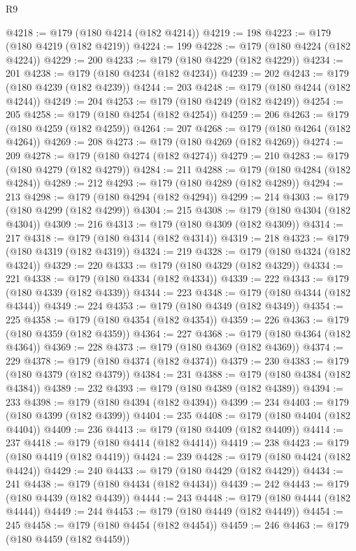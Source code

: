 \begin{lexlean}{R9}
\begin{coremodule}
{{{{{{{{{{{{{{{{{{{{{{{{{{{{{{{{{{{{{{{{{{{{{{{{{{{{{{{{{{{{{{{{{{{{{{{{{{{{{{{{{{{{@4218 := @179 (@180 @4214 (@182 @4214))
@4219 := 198
@4223 := @179 (@180 @4219 (@182 @4219))
@4224 := 199
@4228 := @179 (@180 @4224 (@182 @4224))
@4229 := 200
@4233 := @179 (@180 @4229 (@182 @4229))
@4234 := 201
@4238 := @179 (@180 @4234 (@182 @4234))
@4239 := 202
@4243 := @179 (@180 @4239 (@182 @4239))
@4244 := 203
@4248 := @179 (@180 @4244 (@182 @4244))
@4249 := 204
@4253 := @179 (@180 @4249 (@182 @4249))
@4254 := 205
@4258 := @179 (@180 @4254 (@182 @4254))
@4259 := 206
@4263 := @179 (@180 @4259 (@182 @4259))
@4264 := 207
@4268 := @179 (@180 @4264 (@182 @4264))
@4269 := 208
@4273 := @179 (@180 @4269 (@182 @4269))
@4274 := 209
@4278 := @179 (@180 @4274 (@182 @4274))
@4279 := 210
@4283 := @179 (@180 @4279 (@182 @4279))
@4284 := 211
@4288 := @179 (@180 @4284 (@182 @4284))
@4289 := 212
@4293 := @179 (@180 @4289 (@182 @4289))
@4294 := 213
@4298 := @179 (@180 @4294 (@182 @4294))
@4299 := 214
@4303 := @179 (@180 @4299 (@182 @4299))
@4304 := 215
@4308 := @179 (@180 @4304 (@182 @4304))
@4309 := 216
@4313 := @179 (@180 @4309 (@182 @4309))
@4314 := 217
@4318 := @179 (@180 @4314 (@182 @4314))
@4319 := 218
@4323 := @179 (@180 @4319 (@182 @4319))
@4324 := 219
@4328 := @179 (@180 @4324 (@182 @4324))
@4329 := 220
@4333 := @179 (@180 @4329 (@182 @4329))
@4334 := 221
@4338 := @179 (@180 @4334 (@182 @4334))
@4339 := 222
@4343 := @179 (@180 @4339 (@182 @4339))
@4344 := 223
@4348 := @179 (@180 @4344 (@182 @4344))
@4349 := 224
@4353 := @179 (@180 @4349 (@182 @4349))
@4354 := 225
@4358 := @179 (@180 @4354 (@182 @4354))
@4359 := 226
@4363 := @179 (@180 @4359 (@182 @4359))
@4364 := 227
@4368 := @179 (@180 @4364 (@182 @4364))
@4369 := 228
@4373 := @179 (@180 @4369 (@182 @4369))
@4374 := 229
@4378 := @179 (@180 @4374 (@182 @4374))
@4379 := 230
@4383 := @179 (@180 @4379 (@182 @4379))
@4384 := 231
@4388 := @179 (@180 @4384 (@182 @4384))
@4389 := 232
@4393 := @179 (@180 @4389 (@182 @4389))
@4394 := 233
@4398 := @179 (@180 @4394 (@182 @4394))
@4399 := 234
@4403 := @179 (@180 @4399 (@182 @4399))
@4404 := 235
@4408 := @179 (@180 @4404 (@182 @4404))
@4409 := 236
@4413 := @179 (@180 @4409 (@182 @4409))
@4414 := 237
@4418 := @179 (@180 @4414 (@182 @4414))
@4419 := 238
@4423 := @179 (@180 @4419 (@182 @4419))
@4424 := 239
@4428 := @179 (@180 @4424 (@182 @4424))
@4429 := 240
@4433 := @179 (@180 @4429 (@182 @4429))
@4434 := 241
@4438 := @179 (@180 @4434 (@182 @4434))
@4439 := 242
@4443 := @179 (@180 @4439 (@182 @4439))
@4444 := 243
@4448 := @179 (@180 @4444 (@182 @4444))
@4449 := 244
@4453 := @179 (@180 @4449 (@182 @4449))
@4454 := 245
@4458 := @179 (@180 @4454 (@182 @4454))
@4459 := 246
@4463 := @179 (@180 @4459 (@182 @4459))
}}}}}}}}}}}}}}}}}}}}}}}}}}}}}}}}}}}}}}}}}}}}}}}}}}}}}}}}}}}}}}}}}}}}}}}}}}}}}}}}}}}}
\end{coremodule}
\end{lexlean}
